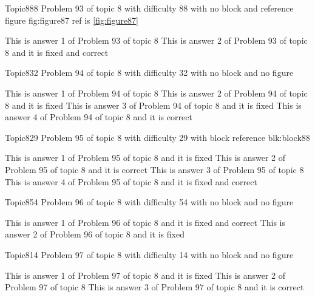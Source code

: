 \documentclass[master]{exam}
\begin{document}
\begin{problem}{Topic8}{88}
	Problem 93 of topic 8 with difficulty 88 with no block and reference figure fig:figure87 ref is \ref{fig:figure87}
	\begin{answers}
		\answer This is answer 1 of Problem 93 of topic 8 
		 This is answer 2 of Problem 93 of topic 8 and it is fixed and correct
	\end{answers}
\end{problem}

\begin{problem}{Topic8}{32}
	Problem 94 of topic 8 with difficulty 32 with no block and no figure
	\begin{answers}
		\answer This is answer 1 of Problem 94 of topic 8 
		\answer[fixed] This is answer 2 of Problem 94 of topic 8 and it is fixed
		\answer[fixed] This is answer 3 of Problem 94 of topic 8 and it is fixed
		\answer[correct] This is answer 4 of Problem 94 of topic 8 and it is correct
	\end{answers}
\end{problem}

\begin{problem}[requires=blk:block88]{Topic8}{29}
	Problem 95 of topic 8 with difficulty 29 with block reference blk:block88
	\begin{answers}
		\answer[fixed] This is answer 1 of Problem 95 of topic 8 and it is fixed
		\answer[correct] This is answer 2 of Problem 95 of topic 8 and it is correct
		\answer This is answer 3 of Problem 95 of topic 8 
		 This is answer 4 of Problem 95 of topic 8 and it is fixed and correct
	\end{answers}
\end{problem}

\begin{problem}{Topic8}{54}
	Problem 96 of topic 8 with difficulty 54 with no block and no figure
	\begin{answers}
		 This is answer 1 of Problem 96 of topic 8 and it is fixed and correct
		\answer[fixed] This is answer 2 of Problem 96 of topic 8 and it is fixed
	\end{answers}
\end{problem}

\begin{problem}{Topic8}{14}
	Problem 97 of topic 8 with difficulty 14 with no block and no figure
	\begin{answers}
		\answer[fixed] This is answer 1 of Problem 97 of topic 8 and it is fixed
		\answer This is answer 2 of Problem 97 of topic 8 
		\answer[correct] This is answer 3 of Problem 97 of topic 8 and it is correct
	\end{answers}
\end{problem}
\end{document}
